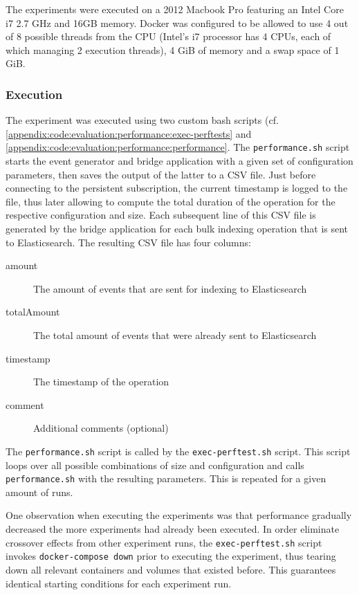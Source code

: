 The experiments were executed on a 2012 Macbook Pro featuring an Intel Core i7 2.7 GHz and 16GB memory.
Docker was configured to be allowed to use 4 out of 8 possible threads from the CPU (Intel's i7 processor has 4 CPUs, each of which managing 2 execution threads), 4 GiB of memory and a swap space of 1 GiB.

\subsubsection{Execution}

The experiment was executed using two custom bash scripts (cf. \cref{appendix:code:evaluation:performance:exec-perftests} and \cref{appendix:code:evaluation:performance:performance}.
The \texttt{performance.sh} script starts the event generator and bridge application with a given set of configuration parameters, then saves the output of the latter to a CSV file.
Just before connecting to the persistent subscription, the current timestamp is logged to the file, thus later allowing to compute the total duration of the operation for the respective configuration and size.
Each subsequent line of this CSV file is generated by the bridge application for each bulk indexing operation that is sent to Elasticsearch.
The resulting CSV file has four columns:

\begin{description}
\item[amount] The amount of events that are sent for indexing to Elasticsearch
\item[totalAmount] The total amount of events that were already sent to Elasticsearch
\item[timestamp] The timestamp of the operation
\item[comment] Additional comments (optional)
\end{description}

The \texttt{performance.sh} script is called by the \texttt{exec-perftest.sh} script.
This script loops over all possible combinations of size and configuration and calls \texttt{performance.sh} with the resulting parameters.
This is repeated for a given amount of runs.

One observation when executing the experiments was that performance gradually decreased the more experiments had already been executed.
In order eliminate crossover effects from other experiment runs, the \texttt{exec-perftest.sh} script invokes \texttt{docker-compose down} prior to executing the experiment, thus tearing down all relevant containers and volumes that existed before.
This guarantees identical starting conditions for each experiment run.

